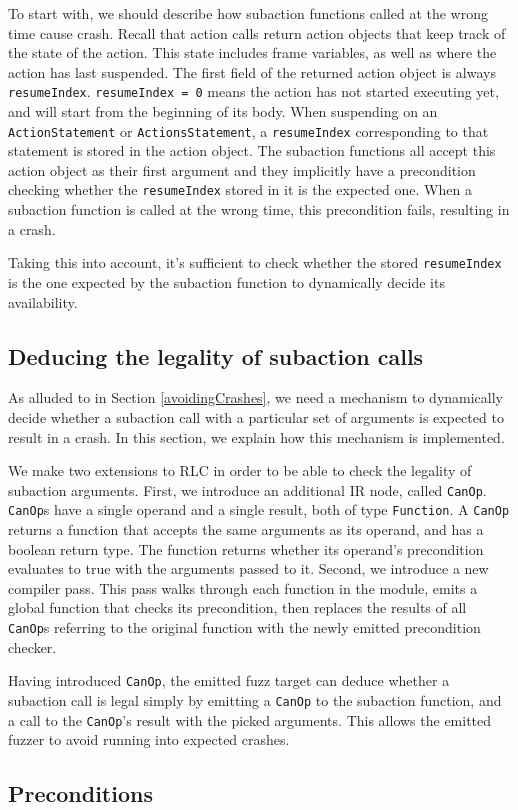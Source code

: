 To start with, we should describe how subaction functions called at the wrong time cause crash.
Recall that action calls return action objects that keep track of the state of the action.
This state includes frame variables, as well as where the action has last suspended.
The first field of the returned action object is always \texttt{resumeIndex}.
\texttt{resumeIndex = 0} means the action has not started executing yet, and will start from the beginning of its body.
When suspending on an \texttt{ActionStatement} or \texttt{ActionsStatement}, a \texttt{resumeIndex} corresponding to that statement is stored in the action object.
The subaction functions all accept this action object as their first argument and they implicitly have a precondition checking whether the \texttt{resumeIndex} stored in it is the expected one.
When a subaction function is called at the wrong time, this precondition fails, resulting in a crash.

Taking this into account, it's sufficient to check whether the stored \texttt{resumeIndex} is the one expected by the subaction function to dynamically decide its availability.

\subsection{Deducing the legality of subaction calls}
As alluded to in Section \ref{avoidingCrashes}, we need a mechanism to dynamically decide whether a subaction call with a particular set of arguments is expected to result in a crash.
In this section, we explain how this mechanism is implemented.

We make two extensions to RLC in order to be able to check the legality of subaction arguments.
First, we introduce an additional IR node, called \texttt{CanOp}.
\texttt{CanOp}s have a single operand and a single result, both of type \texttt{Function}.
A \texttt{CanOp} returns a function that accepts the same arguments as its operand, and has a boolean return type.
The function returns whether its operand's precondition evaluates to true with the arguments passed to it.
Second, we introduce a new compiler pass.
This pass walks through each function in the module, emits a global function that checks its precondition, then replaces the results of all \texttt{CanOp}s referring to the original function with the newly emitted precondition checker.

Having introduced \texttt{CanOp}, the emitted fuzz target can deduce whether a subaction call is legal simply by emitting a \texttt{CanOp} to the subaction function, and a call to the \texttt{CanOp}'s result with the picked arguments.
This allows the emitted fuzzer to avoid running into expected crashes.

\subsection{Preconditions}